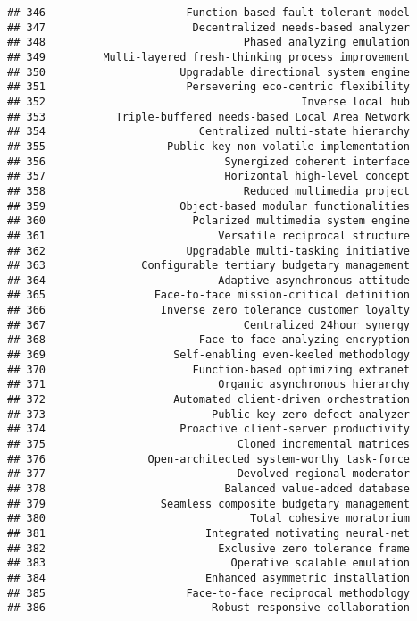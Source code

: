 \documentclass[
]{article}
\begin{document}
\begin{verbatim}
## 346                      Function-based fault-tolerant model
## 347                       Decentralized needs-based analyzer
## 348                               Phased analyzing emulation
## 349         Multi-layered fresh-thinking process improvement
## 350                     Upgradable directional system engine
## 351                      Persevering eco-centric flexibility
## 352                                        Inverse local hub
## 353           Triple-buffered needs-based Local Area Network
## 354                        Centralized multi-state hierarchy
## 355                   Public-key non-volatile implementation
## 356                            Synergized coherent interface
## 357                            Horizontal high-level concept
## 358                               Reduced multimedia project
## 359                     Object-based modular functionalities
## 360                       Polarized multimedia system engine
## 361                           Versatile reciprocal structure
## 362                      Upgradable multi-tasking initiative
## 363               Configurable tertiary budgetary management
## 364                           Adaptive asynchronous attitude
## 365                 Face-to-face mission-critical definition
## 366                  Inverse zero tolerance customer loyalty
## 367                               Centralized 24hour synergy
## 368                        Face-to-face analyzing encryption
## 369                    Self-enabling even-keeled methodology
## 370                       Function-based optimizing extranet
## 371                           Organic asynchronous hierarchy
## 372                    Automated client-driven orchestration
## 373                          Public-key zero-defect analyzer
## 374                     Proactive client-server productivity
## 375                              Cloned incremental matrices
## 376                Open-architected system-worthy task-force
## 377                              Devolved regional moderator
## 378                            Balanced value-added database
## 379                  Seamless composite budgetary management
## 380                                Total cohesive moratorium
## 381                         Integrated motivating neural-net
## 382                           Exclusive zero tolerance frame
## 383                             Operative scalable emulation
## 384                         Enhanced asymmetric installation
## 385                      Face-to-face reciprocal methodology
## 386                          Robust responsive collaboration

\end{verbatim}
\end{document}
